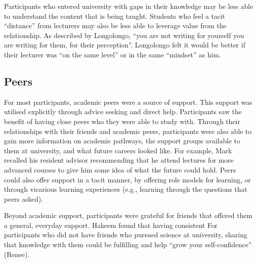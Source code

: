 Participants who entered university with gaps in their knowledge may be less able to understand the content that is being taught. Students who feel a tacit ``distance'' from lecturers may also be less able to leverage value from the relationship. As described by Longolongo, ``you are not writing for yourself you are writing for them, for their perception''. Longolongo felt it would be better if their lecturer was ``on the same level'' or in the same ``mindset'' as him. 



\subsection{Peers}
For most participants, academic peers were a source of support. This support was utilised explicitly through advice seeking and direct help. Participants saw the benefit of having close peers who they were able to study with. Through their relationships with their friends and academic peers, participants were also able to gain more information on academic pathways, the support groups available to them at university, and what future careers looked like. For example, Mark recalled his resident advisor recommending that he attend lectures for more advanced courses to give him some idea of what the future could hold. Peers could also offer support in a tacit manner, by offering role models for learning, or through vicarious learning experiences (e.g., learning through the questions that peers asked). 

Beyond academic support, participants were grateful for friends that offered them a general, everyday support. Hakeem found that having  consistent For participants who did not have friends who pursued science at university, sharing that knowledge with them could be fulfilling and help ``grow your self-confidence'' (Renee).



